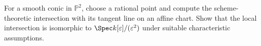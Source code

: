 \begin{problem}\label{chal:vi37-03}
For a smooth conic in \(\mathbb P^2\), choose a rational point and compute the scheme-theoretic intersection with its tangent line on an affine chart. Show that the local intersection is isomorphic to \(\Spec k[\varepsilon]/(\varepsilon^2)\) under suitable characteristic assumptions.
\end{problem}
